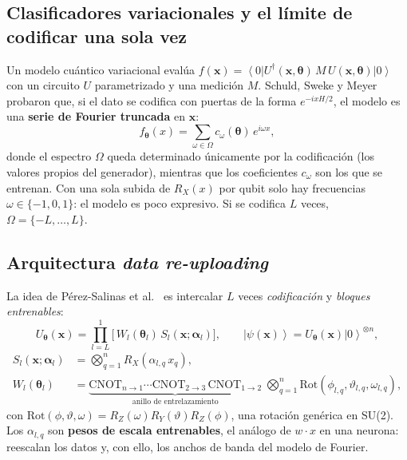 \documentclass[11pt,letterpaper]{article}
\providecommand{\ket}[1]{\left|#1\right\rangle}
\providecommand{\bra}[1]{\left\langle#1\right|}
\begin{document}
\subsection{Clasificadores variacionales y el límite de codificar una sola vez}
Un modelo cuántico variacional evalúa $f(\bm{x})=\bra{0}U^\dagger(\bm{x},\bm\theta)\,M\,U(\bm{x},\bm\theta)\ket{0}$
con un circuito $U$ parametrizado y una medición $M$. Schuld, Sweke y Meyer \cite{schuld2021} probaron
que, si el dato se codifica con puertas de la forma $e^{-ix H/2}$, el modelo es una \textbf{serie de
Fourier truncada} en $\bm{x}$:
\begin{equation}
f_{\bm\theta}(x)=\sum_{\omega\in\Omega} c_\omega(\bm\theta)\,e^{i\omega x},
\end{equation}
donde el espectro $\Omega$ queda determinado únicamente por la codificación (los valores propios del
generador), mientras que los coeficientes $c_\omega$ son los que se entrenan. Con una sola subida de
$R_X(x)$ por qubit solo hay frecuencias $\omega\in\{-1,0,1\}$: el modelo es poco expresivo. Si se
codifica $L$ veces, $\Omega=\{-L,\dots,L\}$.

\subsection{Arquitectura \emph{data re-uploading}}
La idea de Pérez-Salinas et al.\ \cite{perez2020} es intercalar $L$ veces \emph{codificación} y
\emph{bloques entrenables}:
\begin{equation}
U_{\bm\theta}(\bm{x})=\prod_{l=L}^{1}\Big[\,W_l(\bm\theta_l)\,S_l(\bm{x};\bm\alpha_l)\Big],\qquad
\ket{\psi(\bm{x})}=U_{\bm\theta}(\bm{x})\ket{0}^{\otimes n},
\end{equation}
\begin{align}
S_l(\bm{x};\bm\alpha_l)&=\bigotimes_{q=1}^{n}R_X(\alpha_{l,q}\,x_q),\\
W_l(\bm\theta_l)&=\underbrace{\mathrm{CNOT}_{n\to1}\cdots\mathrm{CNOT}_{2\to3}\,\mathrm{CNOT}_{1\to2}}_{\text{anillo de entrelazamiento}}
\;\bigotimes_{q=1}^{n}\mathrm{Rot}(\phi_{l,q},\vartheta_{l,q},\omega_{l,q}),
\end{align}
con $\mathrm{Rot}(\phi,\vartheta,\omega)=R_Z(\omega)R_Y(\vartheta)R_Z(\phi)$, una rotación genérica en
SU(2). Los $\alpha_{l,q}$ son \textbf{pesos de escala entrenables}, el análogo de $w\cdot x$ en una
neurona: reescalan los datos y, con ello, los anchos de banda del modelo de Fourier.
\end{document}
